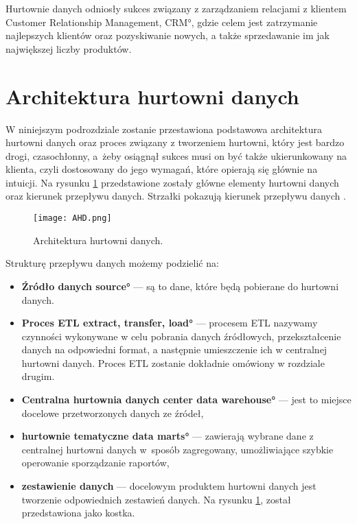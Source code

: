 Hurtownie danych odniosły sukces związany z zarządzaniem relacjami z klientem 
\ang{Customer Relationship Management, CRM},
 gdzie celem jest zatrzymanie najlepszych klientów oraz pozyskiwanie nowych,
 a także sprzedawanie im jak największej liczby produktów.
 

\section{Architektura hurtowni danych} \label{p_temat}
  W niniejszym podrozdziale zostanie przestawiona podstawowa architektura hurtowni danych oraz 
   proces związany z tworzeniem hurtowni, który jest bardzo drogi, czasochłonny, 
   a~żeby osiągnął sukces musi on być także ukierunkowany na klienta,
   czyli dostosowany do jego wymagań, 
   które opierają się głównie na intuicji.
   Na rysunku \ref{fig:AHD} przedstawione zostały główne elementy hurtowni danych oraz kierunek przepływu danych.
   Strzałki pokazują kierunek przepływu danych \cite{TodMan,link_hd}.

\begin{center}
\begin{figure}[H]
  \begin{center}
    \texttt{[image: AHD.png]}
  \end{center}
 \caption{Architektura hurtowni danych. }
    \label{fig:AHD}
\end{figure}
\end{center}


Strukturę przepływu danych możemy podzielić na:
\begin{itemize}
 \item \textbf{Źródło danych \ang{source} } --- 
    są to dane, które będą pobierane do hurtowni danych. 
 \item \textbf{Proces ETL \ang{extract, transfer, load} } --- 
    procesem ETL nazywamy czynności wykonywane w celu pobrania danych źródłowych,
    przekształcenie danych na odpowiedni format, a następnie umieszczenie ich w centralnej hurtowni danych.
    Proces ETL zostanie dokładnie omówiony w rozdziale drugim.
 \item \textbf{Centralna hurtownia danych \ang{center data  warehouse}} --- 
    jest to miejsce docelowe przetworzonych danych ze źródeł,						                                          
 \item \textbf{hurtownie tematyczne \ang{data marts}} --- 
    zawierają wybrane dane z centralnej hurtowni danych w~sposób 
    zagregowany, umożliwiające szybkie operowanie sporządzanie raportów,
 \item \textbf{zestawienie danych } --- 
    docelowym produktem hurtowni danych jest tworzenie odpowiednich zestawień danych.
    Na rysunku \ref{fig:AHD}, został przedstawiona jako kostka.
\end{itemize}

